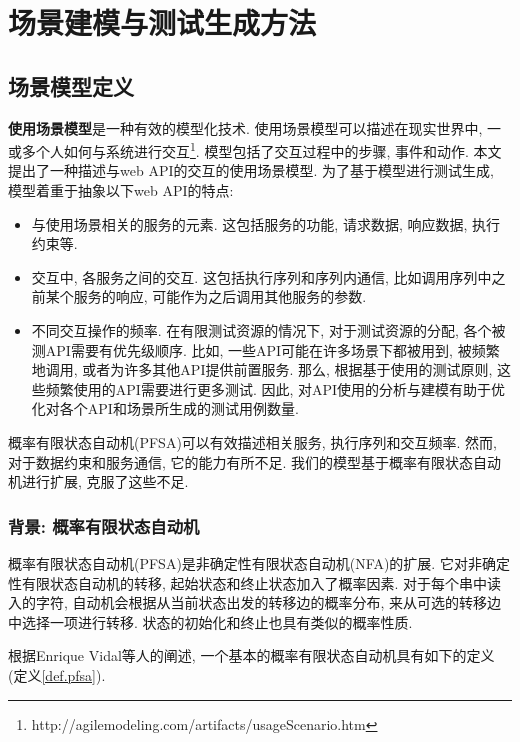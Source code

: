 \chapter{场景建模与测试生成方法}
    \section{场景模型定义}
        \textbf{使用场景模型}是一种有效的模型化技术. 使用场景模型可以描述在现实世界中, 一或多个人如何与系统进行交互\footnote{http://agilemodeling.com/artifacts/usageScenario.htm}. 模型包括了交互过程中的步骤, 事件和动作. 本文提出了一种描述与web API的交互的使用场景模型. 为了基于模型进行测试生成, 模型着重于抽象以下web API的特点:
        
        \begin{itemize}
            \item 与使用场景相关的服务的元素. 这包括服务的功能, 请求数据, 响应数据, 执行约束等.
            
            \item 交互中, 各服务之间的交互. 这包括执行序列和序列内通信, 比如调用序列中之前某个服务的响应, 可能作为之后调用其他服务的参数.
            
            \item 不同交互操作的频率. 在有限测试资源的情况下, 对于测试资源的分配, 各个被测API需要有优先级顺序. 比如, 一些API可能在许多场景下都被用到, 被频繁地调用, 或者为许多其他API提供前置服务. 那么, 根据基于使用的测试原则, 这些频繁使用的API需要进行更多测试. 因此, 对API使用的分析与建模有助于优化对各个API和场景所生成的测试用例数量.
        \end{itemize}
        
        概率有限状态自动机(PFSA)可以有效描述相关服务, 执行序列和交互频率. 然而, 对于数据约束和服务通信, 它的能力有所不足. 我们的模型基于概率有限状态自动机进行扩展, 克服了这些不足.
        
        \subsection{背景: 概率有限状态自动机}
        
            概率有限状态自动机(PFSA)是非确定性有限状态自动机(NFA)的扩展. 它对非确定性有限状态自动机的转移, 起始状态和终止状态加入了概率因素. 对于每个串中读入的字符, 自动机会根据从当前状态出发的转移边的概率分布, 来从可选的转移边中选择一项进行转移. 状态的初始化和终止也具有类似的概率性质.
            
            根据Enrique Vidal等人的阐述\cite{enriquev05}, 一个基本的概率有限状态自动机具有如下的定义(定义\ref{def.pfsa}).
            
